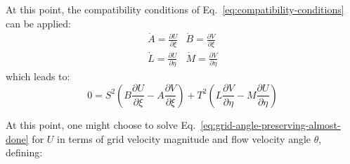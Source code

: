At this point, the compatibility conditions of Eq.~\ref{eq:compatibility-conditions} can be applied:
\[\begin{array}{*{20}{c}}
{\dot A = \frac{{\partial U}}{{\partial \xi }}}&{\dot B = \frac{{\partial V}}{{\partial \xi }}}\\
{\dot L = \frac{{\partial U}}{{\partial \eta }}}&{\dot M = \frac{{\partial V}}{{\partial \eta }}}
\end{array}\]which leads to:
\begin{equation}
\label{eq:grid-angle-preserving-almost-done}
0 = {S^2}\left( {B\frac{{\partial U}}{{\partial \xi }} - A\frac{{\partial V}}{{\partial \xi }}} \right) + {T^2}\left( {L\frac{{\partial V}}{{\partial \eta }} - M\frac{{\partial U}}{{\partial \eta }}} \right)
\end{equation}

At this point, one might choose to solve Eq.~\ref{eq:grid-angle-preserving-almost-done} for $U$ in terms of grid velocity magnitude and flow velocity angle $\theta$, defining:

